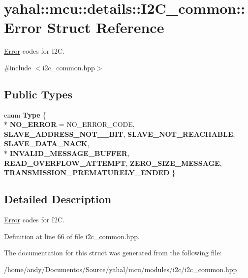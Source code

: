 \hypertarget{structyahal_1_1mcu_1_1details_1_1_i2_c__common_1_1_error}{}\section{yahal\+:\+:mcu\+:\+:details\+:\+:I2\+C\+\_\+common\+:\+:Error Struct Reference}
\label{structyahal_1_1mcu_1_1details_1_1_i2_c__common_1_1_error}


\hyperlink{structyahal_1_1mcu_1_1details_1_1_i2_c__common_1_1_error}{Error} codes for I2\+C.  




{\ttfamily \#include $<$i2c\+\_\+common.\+hpp$>$}

\subsection*{Public Types}
\begin{DoxyCompactItemize}
\item 
\hypertarget{structyahal_1_1mcu_1_1details_1_1_i2_c__common_1_1_error_a8b8e77837be54467fe7bc9ecb823453b}{}enum {\bfseries Type} \{ \\*
{\bfseries N\+O\+\_\+\+E\+R\+R\+O\+R} = N\+O\+\_\+\+E\+R\+R\+O\+R\+\_\+\+C\+O\+D\+E, 
{\bfseries S\+L\+A\+V\+E\+\_\+\+A\+D\+D\+R\+E\+S\+S\+\_\+\+N\+O\+T\+\_\+\_\+\+B\+I\+T}, 
{\bfseries S\+L\+A\+V\+E\+\_\+\+N\+O\+T\+\_\+\+R\+E\+A\+C\+H\+A\+B\+L\+E}, 
{\bfseries S\+L\+A\+V\+E\+\_\+\+D\+A\+T\+A\+\_\+\+N\+A\+C\+K}, 
\\*
{\bfseries I\+N\+V\+A\+L\+I\+D\+\_\+\+M\+E\+S\+S\+A\+G\+E\+\_\+\+B\+U\+F\+F\+E\+R}, 
{\bfseries R\+E\+A\+D\+\_\+\+O\+V\+E\+R\+F\+L\+O\+W\+\_\+\+A\+T\+T\+E\+M\+P\+T}, 
{\bfseries Z\+E\+R\+O\+\_\+\+S\+I\+Z\+E\+\_\+\+M\+E\+S\+S\+A\+G\+E}, 
{\bfseries T\+R\+A\+N\+S\+M\+I\+S\+S\+I\+O\+N\+\_\+\+P\+R\+E\+M\+A\+T\+U\+R\+E\+L\+Y\+\_\+\+E\+N\+D\+E\+D}
 \}\label{structyahal_1_1mcu_1_1details_1_1_i2_c__common_1_1_error_a8b8e77837be54467fe7bc9ecb823453b}

\end{DoxyCompactItemize}


\subsection{Detailed Description}
\hyperlink{structyahal_1_1mcu_1_1details_1_1_i2_c__common_1_1_error}{Error} codes for I2\+C. 

Definition at line 66 of file i2c\+\_\+common.\+hpp.



The documentation for this struct was generated from the following file\+:\begin{DoxyCompactItemize}
\item 
/home/andy/\+Documentos/\+Source/yahal/mcu/modules/i2c/i2c\+\_\+common.\+hpp\end{DoxyCompactItemize}
